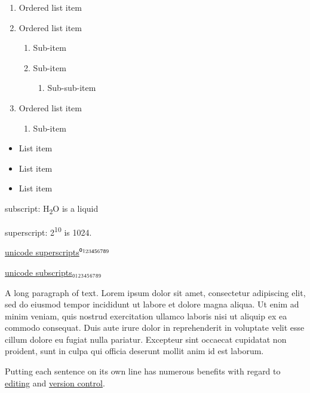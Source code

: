 \begin{enumerate}
\def\labelenumi{\arabic{enumi}.}
\tightlist
\item
  Ordered list item
\item
  Ordered list item

  \begin{enumerate}
  \def\labelenumii{\alph{enumii}.}
  \tightlist
  \item
    Sub-item
  \item
    Sub-item

    \begin{enumerate}
    \def\labelenumiii{\roman{enumiii}.}
    \tightlist
    \item
      Sub-sub-item
    \end{enumerate}
  \end{enumerate}
\item
  Ordered list item

  \begin{enumerate}
  \def\labelenumii{\alph{enumii}.}
  \tightlist
  \item
    Sub-item
  \end{enumerate}
\end{enumerate}

\begin{itemize}
\tightlist
\item
  List item
\item
  List item
\item
  List item
\end{itemize}

subscript: H\textsubscript{2}O is a liquid

superscript: 2\textsuperscript{10} is 1024.

\href{https://www.google.com/search?q=superscript+generator}{unicode superscripts}⁰¹²³⁴⁵⁶⁷⁸⁹

\href{https://www.google.com/search?q=superscript+generator}{unicode subscripts}₀₁₂₃₄₅₆₇₈₉

A long paragraph of text.
Lorem ipsum dolor sit amet, consectetur adipiscing elit, sed do eiusmod tempor incididunt ut labore et dolore magna aliqua.
Ut enim ad minim veniam, quis nostrud exercitation ullamco laboris nisi ut aliquip ex ea commodo consequat.
Duis aute irure dolor in reprehenderit in voluptate velit esse cillum dolore eu fugiat nulla pariatur.
Excepteur sint occaecat cupidatat non proident, sunt in culpa qui officia deserunt mollit anim id est laborum.

Putting each sentence on its own line has numerous benefits with regard to \href{https://asciidoctor.org/docs/asciidoc-recommended-practices/\#one-sentence-per-line}{editing} and \href{https://rhodesmill.org/brandon/2012/one-sentence-per-line/}{version control}.

